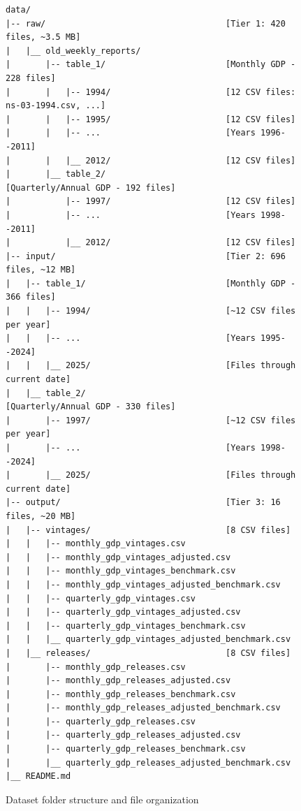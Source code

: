 \documentclass[12pt]{article}
\begin{document}
\begin{figure}[H]
\centering
\caption{Dataset folder structure and file organization}
\label{fig:data_structure}

\begin{verbatim}
data/
|-- raw/                                    [Tier 1: 420 files, ~3.5 MB]
|   |__ old_weekly_reports/
|       |-- table_1/                        [Monthly GDP - 228 files]
|       |   |-- 1994/                       [12 CSV files: ns-03-1994.csv, ...]
|       |   |-- 1995/                       [12 CSV files]
|       |   |-- ...                         [Years 1996--2011]
|       |   |__ 2012/                       [12 CSV files]
|       |__ table_2/                        [Quarterly/Annual GDP - 192 files]
|           |-- 1997/                       [12 CSV files]
|           |-- ...                         [Years 1998--2011]
|           |__ 2012/                       [12 CSV files]
|-- input/                                  [Tier 2: 696 files, ~12 MB]
|   |-- table_1/                            [Monthly GDP - 366 files]
|   |   |-- 1994/                           [~12 CSV files per year]
|   |   |-- ...                             [Years 1995--2024]
|   |   |__ 2025/                           [Files through current date]
|   |__ table_2/                            [Quarterly/Annual GDP - 330 files]
|       |-- 1997/                           [~12 CSV files per year]
|       |-- ...                             [Years 1998--2024]
|       |__ 2025/                           [Files through current date]
|-- output/                                 [Tier 3: 16 files, ~20 MB]
|   |-- vintages/                           [8 CSV files]
|   |   |-- monthly_gdp_vintages.csv
|   |   |-- monthly_gdp_vintages_adjusted.csv
|   |   |-- monthly_gdp_vintages_benchmark.csv
|   |   |-- monthly_gdp_vintages_adjusted_benchmark.csv
|   |   |-- quarterly_gdp_vintages.csv
|   |   |-- quarterly_gdp_vintages_adjusted.csv
|   |   |-- quarterly_gdp_vintages_benchmark.csv
|   |   |__ quarterly_gdp_vintages_adjusted_benchmark.csv
|   |__ releases/                           [8 CSV files]
|       |-- monthly_gdp_releases.csv
|       |-- monthly_gdp_releases_adjusted.csv
|       |-- monthly_gdp_releases_benchmark.csv
|       |-- monthly_gdp_releases_adjusted_benchmark.csv
|       |-- quarterly_gdp_releases.csv
|       |-- quarterly_gdp_releases_adjusted.csv
|       |-- quarterly_gdp_releases_benchmark.csv
|       |__ quarterly_gdp_releases_adjusted_benchmark.csv
|__ README.md
\end{verbatim}

\end{figure}
\end{document}
